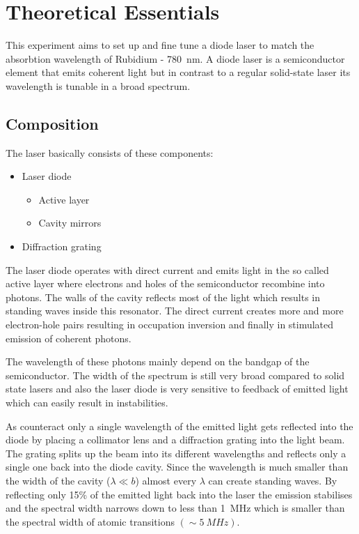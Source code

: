 
\section{Theoretical Essentials}
This experiment aims to set up and fine tune a diode laser to match the absorbtion wavelength of Rubidium - \SI{780}{nm}. A diode laser is a semiconductor element that emits coherent light but in contrast to a regular solid-state laser its wavelength is tunable in a broad spectrum.
\subsection{Composition}
The laser basically consists of these components:
\begin{itemize}
	\item Laser diode
	\begin{itemize}
		\item Active layer
		\item Cavity mirrors
	\end{itemize}
	\item Diffraction grating
\end{itemize}

The laser diode operates with direct current and emits light in the so called active layer where electrons and holes of the semiconductor recombine into photons. The walls of the cavity reflects most of the light which results in standing waves inside this resonator. The direct current creates more and more electron-hole pairs resulting in occupation inversion and finally in stimulated emission of coherent photons.

The wavelength of these photons mainly depend on the bandgap of the semiconductor. The width of the spectrum is still very broad compared to solid state lasers and also the laser diode is very sensitive to feedback of emitted light which can easily result in instabilities. 

As counteract only a single wavelength of the emitted light gets reflected into the diode by placing a collimator lens and a diffraction grating into the light beam. The grating splits up the beam into its different wavelengths and reflects only a single one back into the diode cavity. Since the wavelength is much smaller than the width of the cavity ($\lambda \ll b$) almost every $\lambda$ can create standing waves. By reflecting only 15\% of the emitted light back into the laser the emission stabilises and the spectral width narrows down to less than \SI{1}{MHz} which is smaller than the spectral width of atomic transitions $(\sim \SI{5}{MHz})$.


